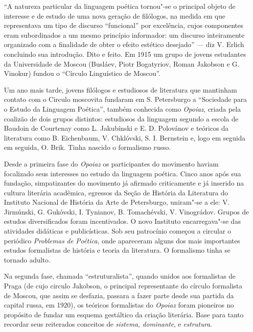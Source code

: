 ``A natureza particular da linguagem poética tornou"-se o principal
objeto de interesse e de estudo de uma nova geração de filólogos, na
medida em que representava um tipo de discurso ``funcional'' por
excelência, cujos componentes eram subordinados a um mesmo princípio
informador: um discurso inteiramente organizado com a finalidade de
obter o efeito estético desejado'' --- diz V. Erlich concluindo sua
introdução. Dito e feito. Em 1915 um grupo de jovens estudantes da
Universidade de Moscou (Busláev, Piotr Bogatyriov, Roman Jakobson e G.
Vinokur) fundou o ``Círculo Linguístico de Moscou''.

Um ano mais tarde, jovens filólogos e estudiosos de literatura que
mantinham contato com o Circulo moscovita fundaram em S. Petersburgo a
``Sociedade para o Estudo da Linguagem Poética'', também conhecida como
\emph{Opoiaz}, criada pela coalizão de dois grupos distintos: estudiosos
da linguagem segundo a escola de Baudoin de Courtenay como L. Jakubínski
e E. D. Polovánov e teóricos da literatura como B. Eichenbaum, V.
Chklóvski, S. I. Bernstein e, logo em seguida em seguida, O. Brik. Tinha
nascido o formalismo russo.

Desde a primeira fase do \emph{Opoiaz} os participantes do movimento
haviam focalizado seus interesses no estudo da linguagem poética. Cinco
anos após sua fundação, simpatizantes do movimento já afirmado
criticamente e já inserido na cultura literária acadêmica, egressos da
Seção de História da Literatura do Instituto Nacional de História da
Arte de Petersburgo, uniram"-se a ele: V. Jirmúnski, G. Gukóvski, I.
Tynianov, B. Tomachévski, V. Vinográdov. Grupos de estudos
diversificados foram incentivados. O novo Instituto encarregava"-se das
atividades didáticas e publicísticas. Sob seu patrocínio começou a
circular o periódico \emph{Problemas de Poética}, onde apareceram alguns
dos mais importantes estudos formalistas de história e teoria da
literatura. O formalismo tinha se tornado adulto.

Na segunda fase, chamada ``estruturalista'', quando unidos aos
formalistas de Praga (de cujo circulo Jakobson, o principal
representante do círculo formalista de Moscou, que assim se desfazia,
passara a fazer parte desde sua partida da capital russa, em 1920), os
teóricos formalistas do \emph{Opoiaz} foram pioneiros no propósito de
fundar um esquema gestáltico da criação literária. Base para tanto
recordar seus reiterados conceitos de \emph{sistema, dominante}, e
\emph{estrutura}.

